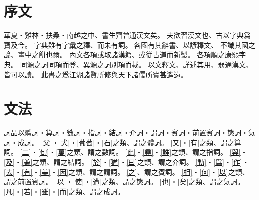 \chapter*{序文}
華夏・雞林・扶桑・南越之中、書生齊曾通漢文矣。
夫欲習漢文也、古以字典爲寶及今。
字典雖有字彙之釋、而未有詞。
各國有其辭書、以諺釋文、
不識其國之諺、畫中之餅也爾。
內文各項或取諸漢籍、或從古道而新製。
各項順之康熙字典。
同源之詞同項而登、異源之詞別項而載。
以文釋文、詳述其用、弱通漢文、皆可以讀。
此書之爲江湖諸賢所修與天下諸儒所寶甚遙遠。
\chapter*{文法}
詞品以體詞・算詞・數詞・指詞・結詞・介詞・謂詞・賓詞・前置賓詞・態詞・氣詞・成詞。
\cref{父}・\cref{犬}・\cref{葡萄}・\cref{石}之類、謂之體詞。
\cref{又}・\cref{有}之類、謂之算詞。
\cref{二}・\cref{旬}・\cref{萬}之類、謂之數詞。
\cref{此}・\cref{堯}・\cref{誰}之類、謂之指詞。
\cref{與}・\cref{及}・\cref{兼}之類、謂之結詞。
\cref{於}・\cref{猶}・\cref{曰}之類、謂之介詞。
\cref{動}・\cref{爲}・\cref{作}・\cref{去}・\cref{有}・\cref{美}・\cref{因}之類、謂之謂詞。
\cref{之}、謂之賓詞。
\cref{相}・\cref{何}・\cref{以}之類、謂之前置賓詞。
\cref{以}・\cref{使}・\cref{遭}之類、謂之態詞。
\cref{也}・\cref{矣}之類、謂之氣詞。
\cref{凡}・\cref{若}・\cref{雖}・\cref{而}之類、謂之成詞。
